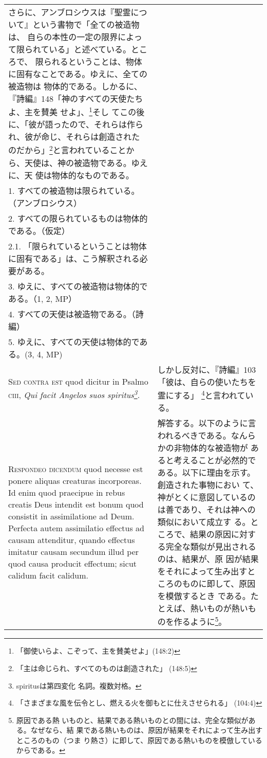\documentclass[10pt]{jsarticle} %
\begin{document}
\begin{longtable}{p{21em}p{21em}}
 さらに、アンブロシウスは『聖霊について』という書物で「全ての被造物は、
 自らの本性の一定の限界によって限られている」と述べている。ところで、
 限られるということは、物体に固有なことである。ゆえに、全ての被造物は
 物体的である。しかるに、『詩編』148「神のすべての天使たちよ、主を賛美
 せよ」、\footnote{「御使いらよ、こぞって、主を賛美せよ」(148:2)}そし
 てこの後に、「彼が語ったので、それらは作られ、彼が命じ、それらは創造された
 のだから」\footnote{「主は命じられ、すべてのものは創造された」
 (148:5)}と言われていることから、天使は、神の被造物である。ゆえに、天
 使は物体的なものである。\footnote{
推論の構造に注意。\\
1. すべての被造物は限られている。（アンブロシウス）\\
2. すべての限られているものは物体的である。（仮定）\\
2.1. 「限られているということは物体に固有である」は、こう解釈される必要がある。 \\
3. ゆえに、すべての被造物は物体的である。（1, 2, MP）\\
4. すべての天使は被造物である。（詩編）\\
5. ゆえに、すべての天使は物体的である。(3, 4, MP)
}

 \\

 {\scshape Sed contra est} quod dicitur in Psalmo {\scshape ciii},
{\itshape Qui facit Angelos suos spiritus\footnote{spiritusは第四変化
名詞。複数対格。}}.


&

しかし反対に、『詩編』103「彼は、自らの使いたちを霊にする」
 \footnote{「さまざまな風を伝令とし、燃える火を御もとに仕えさせられる」
 (104:4)}と言われている。
\\


{\scshape Respondeo dicendum} quod necesse est ponere aliquas
creaturas incorporeas. Id enim quod praecipue in rebus creatis Deus
intendit est bonum quod consistit in assimilatione ad Deum. Perfecta
autem assimilatio effectus ad causam attenditur, quando effectus
imitatur causam secundum illud per quod causa producit effectum; sicut
calidum facit calidum.

&

解答する。以下のように言われるべきである。なんらかの非物体的な被造物が
あると考えることが必然的である。以下に理由を示す。創造された事物におい
て、神がとくに意図しているのは善であり、それは神への類似において成立す
る。ところで、結果の原因に対する完全な類似が見出されるのは、結果が、原
因が結果をそれによって生み出すところのものに即して、原因を模倣するとき
である。たとえば、熱いものが熱いものを作るように\footnote{原因である熱
いものと、結果である熱いものとの間には、完全な類似がある。なぜなら、結
果である熱いものは、原因が結果をそれによって生み出すところのもの（つま
り熱さ）に即して、原因である熱いものを模倣しているからである。}。


\end{longtable}
\end{document}
